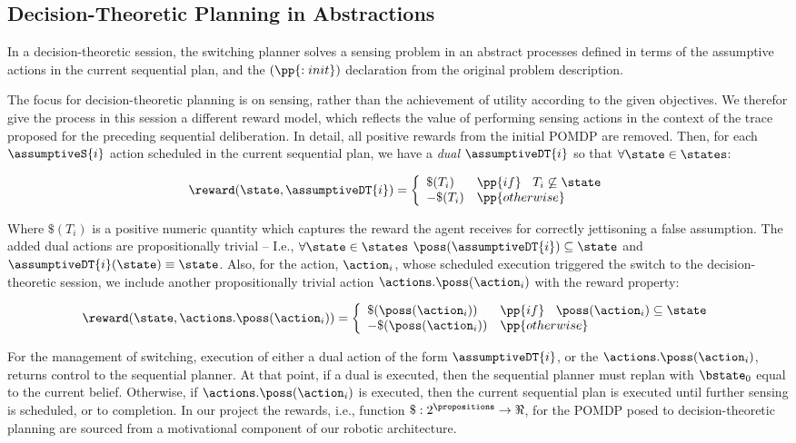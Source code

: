 \subsection{Decision-Theoretic Planning in Abstractions}

In a decision-theoretic session, the switching planner solves a sensing
problem in an abstract processes defined in terms of the assumptive
actions in the current sequential plan, and the $(\pp{:init})$ declaration
from the original problem description. 

The focus for decision-theoretic planning is on sensing, rather than
the achievement of utility according to the given objectives. We
therefor give the process in this session a different reward model, which
reflects the value of performing sensing actions in the context of the
trace proposed for the preceding sequential deliberation. In detail,
all positive rewards from the initial POMDP are removed. Then, for
each $\assumptiveS{i}$ action scheduled in the current sequential
plan, we have a {\em dual} $\assumptiveDT{i}$ so that
$\forall\state\in\states$:

\[
\reward(\state, \assumptiveDT{i}) = \bigg\{ \begin{array}{ll}
\$(T_i) & \pp{if}~\;\;T_i \not\subseteq \state \\
-\$(T_i) & \pp{otherwise} \\
\end{array}
\]

\noindent Where $\$(T_i)$ is a positive numeric quantity which
captures the reward the agent receives for correctly jettisoning a
false assumption. The added dual actions are propositionally trivial
-- I.e., $\forall\state\in\states$ $\poss(\assumptiveDT{i})
\subseteq \state$ and $\assumptiveDT{i}(\state) \equiv \state$.  Also, for the action,
$\action_i$, whose scheduled execution triggered the switch to the
decision-theoretic session, we include another propositionally trivial
action $\actions.\poss(\action_i)$ with the reward property:

\[
\reward(\state, \actions.\poss(\action_i)) = \bigg\{ \begin{array}{ll}
\$(\poss(\action_i)) & \pp{if}~\;\; \poss(\action_i) \subseteq \state \\
-\$(\poss(\action_i)) & \pp{otherwise} \\
\end{array}
\]


For the management of switching, execution of either a dual action of
the form $\assumptiveDT{i}$, or the $\actions.\poss(\action_i)$,
returns control to the sequential planner. At that point, if a dual is
executed, then the sequential planner must replan with $\bstate_0$
equal to the current belief. Otherwise, if $\actions.\poss(\action_i)$
is executed, then the current sequential plan is executed until
further sensing is scheduled, or to completion. In our project the
rewards, i.e., function $\$:2^\propositions\to\Re$, for the POMDP
posed to decision-theoretic planning are sourced from a motivational
component of our robotic architecture.

